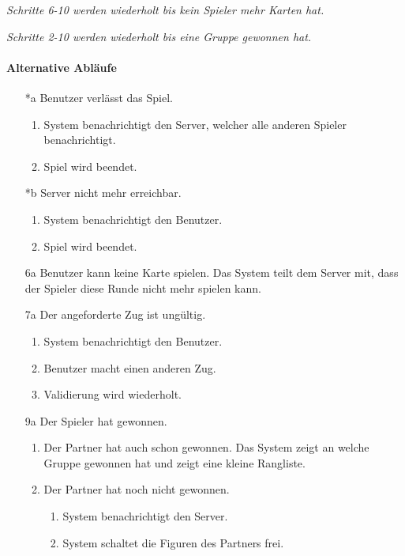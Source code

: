 \documentclass[12pt,halfparskip]{scrartcl}
\begin{document}
\emph{Schritte 6-10 werden wiederholt bis kein Spieler mehr Karten hat.}

\emph{Schritte 2-10 werden wiederholt bis eine Gruppe gewonnen hat.}

\newpage
\paragraph{Alternative Abläufe}
\begin{enumerate}
	\item[*a] Benutzer verlässt das Spiel.
	\begin{enumerate}
		\item System benachrichtigt den Server, welcher alle anderen Spieler benachrichtigt.
		\item Spiel wird beendet.
	\end{enumerate}
	
	\item[*b] Server nicht mehr erreichbar.
	\begin{enumerate}
		\item System benachrichtigt den Benutzer.
		\item Spiel wird beendet.
	\end{enumerate}
	
	\item[6a] Benutzer kann keine Karte spielen.\newline
	Das System teilt dem Server mit, dass der Spieler diese Runde nicht mehr spielen kann.
	
	\item[7a] Der angeforderte Zug ist ungültig.
	\begin{enumerate}
		\item System benachrichtigt den Benutzer.
		\item Benutzer macht einen anderen Zug.
		\item Validierung wird wiederholt.
	\end{enumerate}
	
	\item[9a] Der Spieler hat gewonnen.
	\begin{enumerate}
		\item Der Partner hat auch schon gewonnen.\newline
		Das System zeigt an welche Gruppe gewonnen hat und zeigt eine kleine Rangliste.
		\item Der Partner hat noch nicht gewonnen.
		\begin{enumerate}
			\item System benachrichtigt den Server.
			\item System schaltet die Figuren des Partners frei.
		\end{enumerate}
	\end{enumerate}
\end{enumerate}
\end{document}
